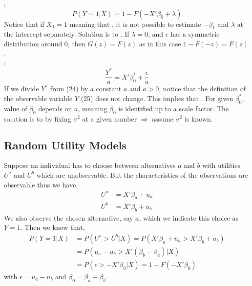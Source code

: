 : 
\begin{equation}
    P(Y=1|X) = 1 - F(-X'\beta_0+\lambda)
\end{equation}
Notice that if $X_1 = 1$ meaning that , 
it is not possible to estimate $-\beta_1$ and $\lambda$ at the intercept separately. 
Solution is to . If $\lambda = 0$, and $\epsilon$ has a symmetric distribution around 0,
then $G(z) = F(z)$ as in this case $1-F(-z) = F(z)$.\\

: 
\begin{equation}
    \frac{Y^*}{a} = X'\beta_0^*+\frac{\epsilon}{a}
\end{equation}
If we divide $Y^*$ from (24) by a constant $a$ and $a>0$, 
notice that the definition of the observable variable $Y$ (25) does not change.
 This implies that .
For given $\beta_0^*$, value of $\beta_0$ depends on $a$, meaning $\beta_0$ is identified up to a scale factor.
The solution is to  by fixing $\sigma^2$ at a given number $\Rightarrow$ assume $\sigma^2$ is known.

\subsection{Random Utility Models}
Suppose an individual has to choose between alternatives $a$ and $b$ with utilities $U^a$ and $U^b$ which are unobservable.
But the characteristics of the observations are observable thus we have,
\begin{align*}
    U^a & = X'\beta_a + u_a\\
    U^b & = X'\beta_b + u_b
\end{align*}
We also observe the chosen alternative, say $a$, which we indicate this choice as $Y=1$.
Then we know that,
\begin{align*}
    P(Y=1|X) & = P(U^a > U^b|X) = P(X'\beta_a+u_a > X'\beta_b+u_b)\\
    & = P(u_a-u_b>X'(\beta_b-\beta_a)|X)\\
    & = P(\epsilon > -X'\beta_0|X) = 1 - F(-X'\beta_0)
\end{align*}
with $\epsilon = u_a-u_b$ and $\beta_0=\beta_a-\beta_b$.

